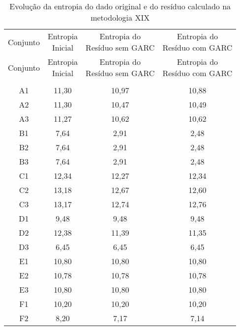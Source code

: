 \begin{center}
\begin{longtable}{cccc}
\toprule
\rowcolor{white}
\caption[Metodologia XIX: evolução da entropia]{Evolução da entropia do dado
original e do resíduo calculado na metodologia XIX}
\label{tab:EvolucaoEntropiaMet19}\\
\midrule
Conjunto & \specialcell{Entropia \\Inicial} & \specialcell{Entropia do
\\Resíduo sem GARC} & \specialcell{Entropia do
\\Resíduo com GARC}  \\
\midrule
\endfirsthead
\midrule
\rowcolor{white}
Conjunto & \specialcell{Entropia \\Inicial} & \specialcell{Entropia do
\\Resíduo sem GARC} & \specialcell{Entropia do
\\Resíduo com GARC}  \\
\toprule
\endhead
\midrule \\ %
\endfoot
\bottomrule 
\endlastfoot
    A1    & 11,30 & 10,97 & 10,88 \\
    A2    & 11,30 & 10,47 & 10,49 \\
    A3    & 11,27 & 10,62 & 10,62 \\
    B1    & 7,64  & 2,91  & 2,48 \\
    B2    & 7,64  & 2,91  & 2,48 \\
    B3    & 7,64  & 2,91  & 2,48 \\
    C1    & 12,34 & 12,27 & 12,34 \\
    C2    & 13,18 & 12,67 & 12,60 \\
    C3    & 13,17 & 12,74 & 12,76 \\
    D1    & 9,48  & 9,48  & 9,48 \\
    D2    & 12,38 & 11,39 & 11,35 \\
    D3    & 6,45  & 6,45  & 6,45 \\
    E1    & 10,80 & 10,80 & 10,80 \\
    E2    & 10,78 & 10,78 & 10,78 \\
    E3    & 10,80 & 10,80 & 10,80 \\
    F1    & 10,20 & 10,20 & 10,20 \\
    F2    & 8,20  & 7,17  & 7,14 \\

\end{longtable}
\end{center}
